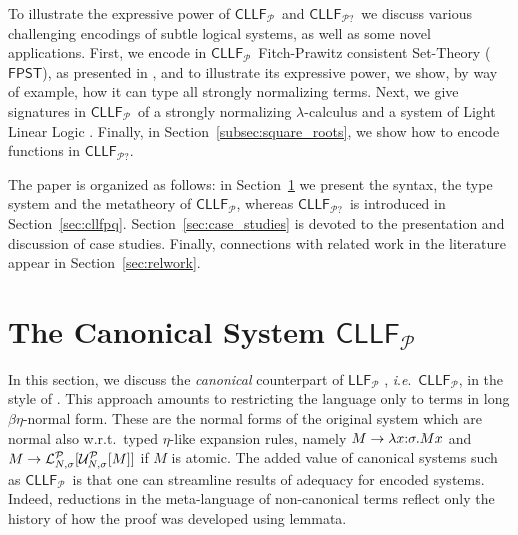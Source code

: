 \documentclass[submission,copyright,creativecommons]{eptcs}
\theoremstyle{plain}
\theoremstyle{definition}
\newcommand{\LLFP}  {\mbox{$\mathsf{LLF}_{\mathcal P}$}}
\newcommand{\CLLFP} {\mbox{$\mathsf{CLLF}_{\mathcal P}$}}
\newcommand{\CLLFPQ} {\mbox{$\mathsf{CLLF}_{\mathcal P?}$}}
\newcommand{\FPST}   {\mbox{$\mathsf{FPST}$}}
\newcommand {\ie}        {{\textit{i}.\textit{e}.}}
\newcommand {\wrt}       {{\textrm{w}.\textrm{r}.\textrm{t}.}}
\newcommand {\Lock}   [4] {{\mathcal{L}}^{#1}_{#2, #3}[{#4}]} \newcommand {\LockC} [3] {{\mathcal{L}}^{#1}_{#2}      [{#3}]}
\renewcommand {\P} {\mathcal{P}} \newcommand {\Q} {\mathcal{Q}}
\begin{document}
To illustrate the expressive power of \CLLFP\ and \CLLFPQ\ we discuss
various challenging encodings of subtle logical systems, as well as
some novel applications. First, we encode in \CLLFP\ Fitch-Prawitz
consistent Set-Theory (\FPST), as presented in \cite{prawitz}, and to
illustrate its expressive power, we show, by way of example, how
it can type all strongly normalizing terms. Next, we give signatures
in \CLLFP\ of a strongly normalizing $\lambda$-calculus and a system of
Light Linear Logic \cite{DBLP:conf/lics/BaillotCL07}. Finally, in
Section~\ref{subsec:square_roots}, we show how to encode functions in
\CLLFPQ.

The paper is organized as follows: in Section~\ref{sec:canonical} we
present the syntax, the type system and the metatheory of \CLLFP,
whereas \CLLFPQ\ is introduced in
Section~\ref{sec:cllfpq}. Section~\ref{sec:case_studies} is devoted to
the presentation and discussion of case studies. Finally, connections
with related work in the literature appear in
Section~\ref{sec:relwork}.

\section{The Canonical System \CLLFP} \label{sec:canonical}
In this section, we discuss the \emph{canonical} counterpart of \LLFP
\cite{HLMS15}, \ie\ \CLLFP, in the style of
\cite{watkins-02,HarperLicata-jfp-07}. This approach amounts to
restricting the language only to terms in long $\beta\eta$-normal
form. These are the normal forms of the original system which are
normal also \wrt\ typed $\eta$-like expansion rules, namely
$M \rightarrow \lambda x{:}\sigma.Mx$ and
$M \rightarrow \Lock{\P}{N}{\sigma}{\Unlock{\P}{N}{\sigma}{M}}$ if $M$ is atomic. The added value of
canonical systems such as \CLLFP\ is that one can streamline results
of adequacy for encoded systems. Indeed, reductions in the
                        meta-language of non-canonical terms reflect only the history of how
the proof was developed using lemmata.
\end{document}
